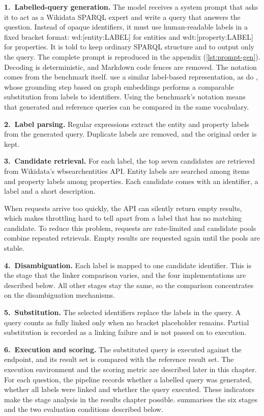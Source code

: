 \textbf{1.\ Labelled-query generation.}
The model receives a system prompt that asks it to act as a Wikidata SPARQL expert and write a query that answers the question.
Instead of opaque identifiers, it must use human-readable labels in a fixed bracket format: wd:[entity:LABEL] for entities and wdt:[property:LABEL] for properties.
It is told to keep ordinary SPARQL structure and to output only the query.
The complete prompt is reproduced in the appendix (\cref{lst:prompt-gen}).
Decoding is deterministic, and Markdown code fences are removed.
The notation comes from the benchmark itself.
\textcite{xu2023wikisp} use a similar label-based representation, as do \textcite{banerjee2023gettqa}, whose grounding step based on graph embeddings performs a comparable substitution from labels to identifiers.
Using the benchmark's notation means that generated and reference queries can be compared in the same vocabulary.

\textbf{2.\ Label parsing.}
Regular expressions extract the entity and property labels from the generated query.
Duplicate labels are removed, and the original order is kept.

\textbf{3.\ Candidate retrieval.}
For each label, the top seven candidates are retrieved from Wikidata's wbsearchentities API.
Entity labels are searched among items and property labels among properties.
Each candidate comes with an identifier, a label and a short description.

When requests arrive too quickly, the API can silently return empty results, which makes throttling hard to tell apart from a label that has no matching candidate.
To reduce this problem, requests are rate-limited and candidate pools combine repeated retrievals.
Empty results are requested again until the pools are stable.

\textbf{4.\ Disambiguation.}
Each label is mapped to one candidate identifier.
This is the stage that the linker comparison varies, and the four implementations are described below.
All other stages stay the same, so the comparison concentrates on the disambiguation mechanisms.

\textbf{5.\ Substitution.}
The selected identifiers replace the labels in the query.
A query counts as fully linked only when no bracket placeholder remains.
Partial substitution is recorded as a linking failure and is not passed on to execution.

\textbf{6.\ Execution and scoring.}
The substituted query is executed against the endpoint, and its result set is compared with the reference result set.
The execution environment and the scoring metric are described later in this chapter.
For each question, the pipeline records whether a labelled query was generated, whether all labels were linked and whether the query executed.
These indicators make the stage analysis in the results chapter possible.
 summarises the six stages and the two evaluation conditions described below.

